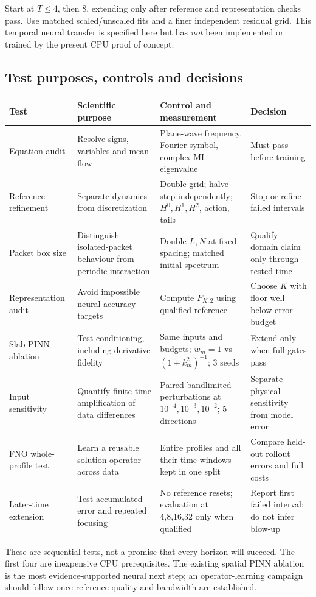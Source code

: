 Start at $T\le4$, then $8$, extending only after reference and representation checks pass. Use matched scaled/unscaled fits and a finer independent residual grid. This temporal neural transfer is specified here but has \emph{not} been implemented or trained by the present CPU proof of concept.
\clearpage
\subsection{Test purposes, controls and decisions}
\small
\begin{longtable}{p{.15\linewidth}p{.29\linewidth}p{.28\linewidth}p{.17\linewidth}}
\toprule Test & Scientific purpose & Control and measurement & Decision \\\midrule\endhead
Equation audit & Resolve signs, variables and mean flow & Plane-wave frequency, Fourier symbol, complex MI eigenvalue & Must pass before training \\
Reference refinement & Separate dynamics from discretization & Double grid; halve step independently; $H^0,H^1,H^2$, action, tails & Stop or refine failed intervals \\
Packet box size & Distinguish isolated-packet behaviour from periodic interaction & Double $L,N$ at fixed spacing; matched initial spectrum & Qualify domain claim only through tested time \\
Representation audit & Avoid impossible neural accuracy targets & Compute $F_{K,2}$ using qualified reference & Choose $K$ with floor well below error budget \\
Slab PINN ablation & Test conditioning, including derivative fidelity & Same inputs and budgets; $w_m=1$ vs $(1+k_m^2)^{-1}$; 3 seeds & Extend only when full gates pass \\
Input sensitivity & Quantify finite-time amplification of data differences & Paired bandlimited perturbations at $10^{-4},10^{-3},10^{-2}$; 5 directions & Separate physical sensitivity from model error \\
FNO whole-profile test & Learn a reusable solution operator across data & Entire profiles and all their time windows kept in one split & Compare held-out rollout errors and full costs \\
Later-time extension & Test accumulated error and repeated focusing & No reference resets; evaluation at 4,8,16,32 only when qualified & Report first failed interval; do not infer blow-up \\
\bottomrule
\end{longtable}\normalsize
These are sequential tests, not a promise that every horizon will succeed. The first four are inexpensive CPU prerequisites. The existing spatial PINN ablation is the most evidence-supported neural next step; an operator-learning campaign should follow once reference quality and bandwidth are established.

